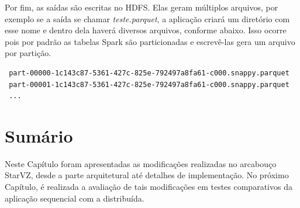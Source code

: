 Por fim, as saídas são escritas no HDFS. Elas geram múltiplos arquivos, por 
exemplo se a saída se chamar \emph{teste.parquet}, a aplicação criará um 
diretório com esse nome e dentro dela haverá diversos arquivos, conforme abaixo. 
Isso ocorre pois por padrão as tabelas Spark são particionadas e escrevê-las 
gera um arquivo por partição.

\footnotesize
\begin{lstlisting}
 part-00000-1c143c87-5361-427c-825e-792497a8fa61-c000.snappy.parquet
 part-00001-1c143c87-5361-427c-825e-792497a8fa61-c000.snappy.parquet
 ...
\end{lstlisting}
\normalsize

\section{Sumário} \label{sect:summary}

Neste Capítulo foram apresentadas as modificações realizadas no arcabouço 
StarVZ, desde a parte arquitetural até detalhes de implementação. No próximo 
Capítulo, é realizada a avaliação de tais modificações em testes comparativos 
da aplicação sequencial com a distribuída.

